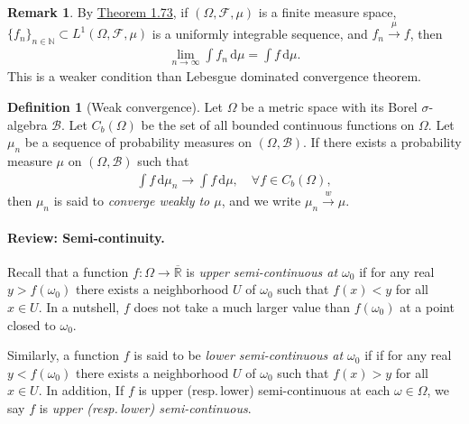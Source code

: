 \documentclass{article}
\numberwithin{equation}{section}
\renewcommand{\d}{\mathrm{d}}
\theoremstyle{plain}
\theoremstyle{definition}
\newtheorem{definition}[theorem]{Definition}
\newtheorem*{remark}{Remark}
\begin{document}
\begin{remark} By \hyperref[thm:1.73]{Theorem 1.73}, if $(\Omega,\mathscr{F},\mu)$ is a finite measure space, $\{f_n\}_{n\in\mathbb{N}}\subset L^1(\Omega,\mathscr{F},\mu)$ is a uniformly integrable sequence, and $f_n\overset{\mu}{\to}f$, then
\begin{align*}
	\lim_{n\to\infty}\int f_n\,\d \mu = \int f\,\d \mu.
\end{align*}
This is a weaker condition than Lebesgue dominated convergence theorem.
\end{remark}

\begin{definition}[Weak convergence]\label{def:1.74} Let $\Omega$ be a metric space with its Borel $\sigma$-algebra $\mathscr{B}$.  Let $C_b(\Omega)$ be the set of all bounded continuous functions on $\Omega$. Let $\mu_n$ be a sequence of probability measures on $(\Omega,\mathscr{B})$. If there exists a probability measure $\mu$ on $(\Omega,\mathscr{B})$ such that
\begin{align*}
	\int f\,\d \mu_n \to \int f\,\d \mu,\quad \forall f\in C_b(\Omega),
\end{align*}
then $\mu_n$ is said to \textit{converge weakly to $\mu$}, and we write $\mu_n\overset{w}{\to}\mu$.
\end{definition}
\paragraph{Review: Semi-continuity.} Recall that a function $f:\Omega\to\overline{\mathbb{R}}$ is \textit{upper semi-continuous at $\omega_0$} if for any real $y>f(\omega_0)$ there exists a neighborhood $U$ of $\omega_0$ such that $f(x)<y$ for all $x\in U$. In a nutshell, $f$ does not take a much larger value than $f(\omega_0)$ at a point closed to $\omega_0$. 

Similarly, a function $f$ is said to be \textit{lower semi-continuous at $\omega_0$} if if for any real $y<f(\omega_0)$ there exists a neighborhood $U$ of $\omega_0$ such that $f(x)>y$ for all $x\in U$. In addition, If $f$ is upper (resp.\,lower) semi-continuous at each $\omega\in\Omega$, we say $f$ is \textit{upper (resp.\,lower) semi-continuous}.
\end{document}
